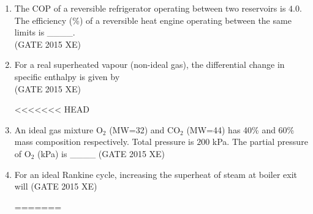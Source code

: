 \documentclass[journal,12pt,onecolumn]{IEEEtran}
\begin{document}
\begin{enumerate}
\begin{enumerate}
\begin{enumerate}
\item The COP of a reversible refrigerator operating between two reservoirs is $4.0$. The efficiency (\%) of a reversible heat engine operating between the same limits is \_\_\_\_. \\
\hfill{(GATE 2015 XE)} 

\item For a real superheated vapour (non-ideal gas), the differential change in specific enthalpy is given by  \\
\hfill{(GATE 2015 XE)} 
\begin{multicols}{2}
<<<<<<< HEAD
\end{multicols}

\item An ideal gas mixture O$_2$ (MW=32) and CO$_2$ (MW=44) has 40\% and 60\% mass composition respectively. Total pressure is $200$ kPa. The partial pressure of O$_2$ (kPa) is \_\_\_\_
\hfill{(GATE 2015 XE)} \\

\newpage

\item For an ideal Rankine cycle, increasing the superheat of steam at boiler exit will 
\hfill{(GATE 2015 XE)} \\
\begin{multicols}{2}
\begin{enumerate}
=======
\vspace{0.5cm}


\end{enumerate}
\end{multicols}
\end{enumerate}
\end{enumerate}
\end{enumerate}
\end{document}
